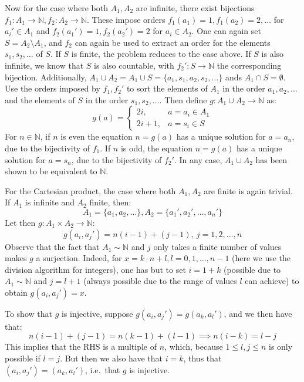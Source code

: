 \begin{solution}
\begin{itemize}
        Now for the case where both $A_1, A_2$ are infinite, there exist bijections $f_1 : A_1 \rightarrow \mathbb{N}, f_2 : A_2 \rightarrow \mathbb{N}$. 
        These impose orders $f_1(a_1) = 1, f_1(a_2) = 2, \ldots$ for $a_i' \in A_1$ and $f_2(a_1') = 1, f_2(a_2') = 2$ for $a_i \in A_2$.
        One can again set $S = A_2 \setminus A_1$, and $f_2$ can again be used to extract an order for the elements $s_1, s_2, \ldots$ of $S$. 
        If $S$ is finite, the problem reduces to the case above.
        If $S$ is also infinite, we know that $S$ is also countable, with $f_2': S \rightarrow \mathbb{N}$ the corresponding bijection.
        Additionally, $A_1 \cup A_2 = A_1 \cup S = \{a_1, s_1, a_2, s_2, \ldots\}$ ands $A_1 \cap S = \emptyset$. 
        Use the orders imposed by $f_1, f_2'$ to sort the elements of $A_1$ in the order $a_1, a_2, \ldots$ and the elements of $S$ in the order $s_1, s_2, \ldots$. 
        Then define $g:A_1 \cup A_2 \rightarrow \mathbb{N}$ as:
        $$g(a) = \begin{cases} 2i, & a = a_i \in A_1 \\
            2i + 1, & a = s_i \in S
            \end{cases}$$
        For $n \in \mathbb{N}$, if $n$ is even the equation $n = g(a)$ has a unique solution for $a = a_n$, due to the bijectivity of $f_1$.
        If $n$ is odd, the equation $n = g(a)$ has a unique solution for $a = s_n$, due to the bijectivity of $f_2'$. In any case, $A_1 \cup A_2$ has been shown to be equivalent to $\mathbb{N}$.

        For the Cartesian product, the case where both $A_1, A_2$ are finite is again trivial. 
        If $A_1$ is infinite and $A_2$ finite, then:
        $$A_1 = \{a_1, a_2, \ldots\}, A_2 = \{a_1', a_2', \ldots, a_n'\}$$
        Let then $g: A_1 \times A_2 \rightarrow \mathbb{N}$:
        $$g(a_i, a_j') = n(i-1) + (j - 1), \ j = 1, 2, \ldots, n$$
        Observe that the fact that $A_1 \sim \mathbb{N}$  and $j$ only takes a finite number of values makes $g$ a surjection. Indeed, for $x = k\cdot n + l, l = 0, 1, \ldots, n - 1$ (here we use the division algorithm for integers), one has but to set $i = 1 + k$ (possible due to $A_1 \sim \mathbb{N}$ and $j = l + 1$  (always possible due to the range of values $l$ can achieve) to obtain $g(a_i, a_j') = x$.\

        To show that $g$ is injective, suppose $g(a_i, a_j') = g(a_k, a_l')$, and we then have that:
        $$n(i - 1) + (j - 1) = n(k - 1) + (l - 1) \implies n(i - k) = l - j$$
        This implies that the RHS is a multiple of $n$, which, because $1 \leq l, j \leq n$ is only possible if $l = j$. But then we also have that $i = k$, thus that $(a_i, a_j') = (a_k, a_l')$, i.e.\ that $g$ is injective.


\end{itemize}
\end{solution}
